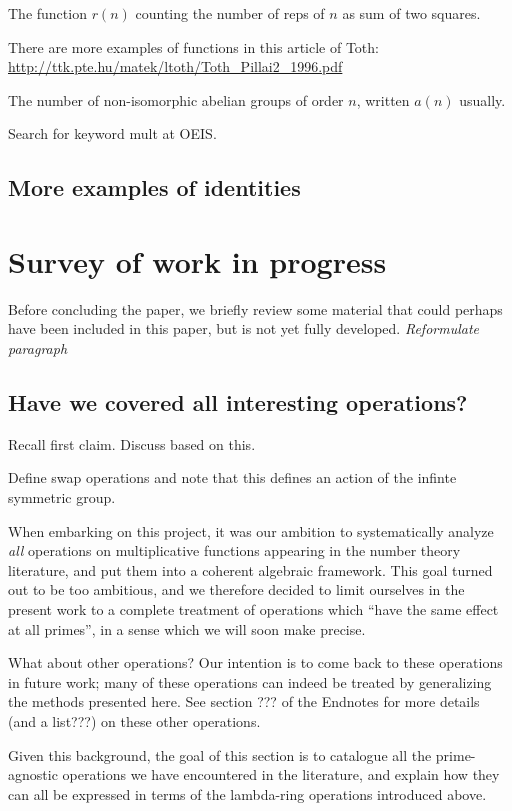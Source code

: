 \documentclass[a4paper]{article}
\theoremstyle{definition}
\theoremstyle{remark}
\begin{document}
The function $r(n)$ counting the number of reps of $n$ as sum of two squares.

There are more examples of functions in this article of Toth: \url{http://ttk.pte.hu/matek/ltoth/Toth_Pillai2_1996.pdf}

The number of non-isomorphic abelian groups of order $n$, written $a(n)$ usually.

Search for keyword mult at OEIS.

\subsection{More examples of identities}





\section{Survey of work in progress}

Before concluding the paper, we briefly review some material that could perhaps have been included in this paper, but is not yet fully developed.  \emph{Reformulate paragraph}

\subsection{Have we covered all interesting operations?}

Recall first claim. Discuss based on this. 

Define swap operations and note that this defines an action of the infinte symmetric group.

When embarking on this project, it was our ambition to systematically analyze \emph{all} operations on multiplicative functions appearing in the number theory literature, and put them into a coherent algebraic framework. This goal turned out to be too ambitious, and we therefore decided to limit ourselves in the present work to a complete treatment of operations which ``have the same effect at all primes'', in a sense which we will soon make precise.

What about other operations? Our intention is to come back to these operations in future work; many of these operations can indeed be treated by generalizing the methods presented here. See section ??? of the Endnotes for more details (and a list???) on these other operations. 

Given this background, the goal of this section is to catalogue all the prime-agnostic operations we have encountered in the literature, and explain how they can all be expressed in terms of the lambda-ring operations introduced above.
\end{document}
